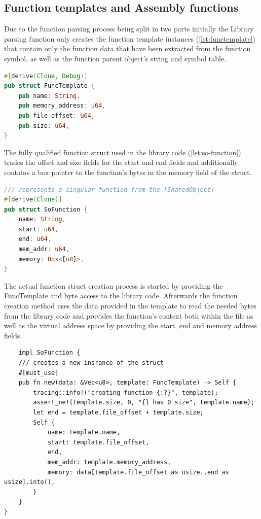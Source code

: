 \subsection{Function templates and Assembly functions}

Due to the function parsing process being split in two parts initially the Library parsing function only creates the function template instances (\autoref{lst:functemplate}) that contain only the function data that have been extracted from the function symbol, as well as the function parent object's string and symbol table.
\begin{lstlisting}[caption=\label{lst:functemplate}"The Function template struct", language=Rust]
#[derive(Clone, Debug)]
pub struct FuncTemplate {
    pub name: String,
    pub memory_address: u64,
    pub file_offset: u64,
    pub size: u64,
}
\end{lstlisting}

The fully qualified function struct used in the library code (\autoref{lst:so-function}) trades the offset and size fields for the start and end fields and additionally contains a box pointer to the function's bytes in the memory field of the struct.
\begin{lstlisting}[caption=\label{lst:so-function}"The x86 shared object function struct", language=Rust]
/// represents a singular function from the [SharedObject]
#[derive(Clone)]
pub struct SoFunction {
    name: String,
    start: u64,
    end: u64,
    mem_addr: u64,
    memory: Box<[u8]>,
}
\end{lstlisting}
The actual function struct creation process is started by providing the FuncTemplate and byte access to the library code. 
Afterwards the function creation method uses the data provided in the template to read the needed bytes from the library code and provides the function's context both within the file as well as the virtual address space by providing the start, end and memory address fields. 
\begin{lstlisting}
    impl SoFunction {
    /// creates a new insrance of the struct
    #[must_use]
    pub fn new(data: &Vec<u8>, template: FuncTemplate) -> Self {
        tracing::info!("creating function {:?}", template);
        assert_ne!(template.size, 0, "{} has 0 size", template.name);
        let end = template.file_offset + template.size;
        Self {
            name: template.name,
            start: template.file_offset,
            end,
            mem_addr: template.memory_address,
            memory: data[template.file_offset as usize..end as usize].into(),
        }
    }
}
\end{lstlisting}

